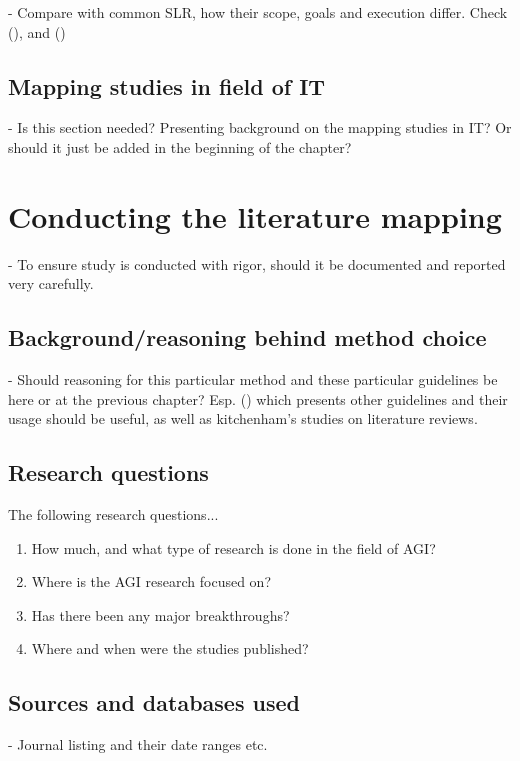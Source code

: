 \documentclass[utf8,english]{gradu3}
\begin{document}
- Compare with common SLR, how their scope, goals and execution differ.
Check (\cite{keele2007}), and (\cite{kitchenham2010})

\section{Mapping studies in field of IT}

- Is this section needed? Presenting background on the mapping studies in IT?
Or should it just be added in the beginning of the chapter?

\chapter{Conducting the literature mapping}

- To ensure study is conducted with rigor, should it be documented and reported
very carefully.

\section{Background/reasoning behind method choice}

- Should reasoning for this particular method and these particular guidelines
be here or at the previous chapter? Esp. (\cite{petersen2015}) which presents
other guidelines and their usage should be useful, as well as kitchenham's 
studies on literature reviews.

\section{Research questions}

The following research questions...

\begin{enumerate}
  \item How much, and what type of research is done in the field of AGI?
  \item Where is the AGI research focused on?
  \item Has there been any major breakthroughs?
  \item Where and when were the studies published?
\end{enumerate}

\section{Sources and databases used}
- Journal listing and their date ranges etc.
\end{document}
